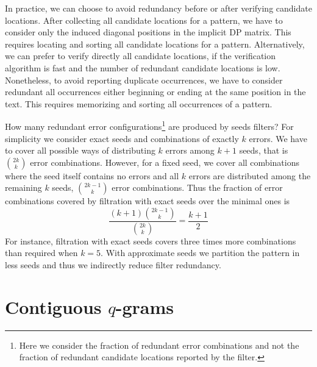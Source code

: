 In practice, we can choose to avoid redundancy before or after verifying candidate locations.
After collecting all candidate locations for a pattern, we have to consider only the induced diagonal positions in the implicit DP matrix.
This requires locating and sorting all candidate locations for a pattern.
Alternatively, we can prefer to verify directly all candidate locations, \eg if the verification algorithm is fast and the number of redundant candidate locations is low.
Nonetheless, to avoid reporting duplicate occurrences, we have to consider redundant all occurrences either beginning or ending at the same position in the text.
This requires memorizing and sorting all occurrences of a pattern.

How many redundant error configurations\footnote{Here we consider the fraction of redundant error combinations and not the fraction of redundant candidate locations reported by the filter.} are produced by seeds filters?
For simplicity we consider exact seeds and combinations of exactly $k$ errors.
We have to cover all possible ways of distributing $k$ errors among $k+1$ seeds, that is $\binom{2k}{k}$ error combinations.
However, for a fixed seed, we cover all combinations where the seed itself contains no errors and all $k$ errors are distributed among the remaining $k$ seeds, \ie $\binom{2k-1}{k}$ error combinations.
Thus the fraction of error combinations covered by filtration with exact seeds over the minimal ones is
\begin{equation}
\frac{(k+1)\binom{2k-1}{k}}{\binom{2k}{k}} = \frac{k+1}{2}
\end{equation}
For instance, filtration with exact seeds covers three times more combinations than required when $k=5$.
With approximate seeds we partition the pattern in less seeds and thus we indirectly reduce filter redundancy.


\section{Contiguous $q$-grams}

